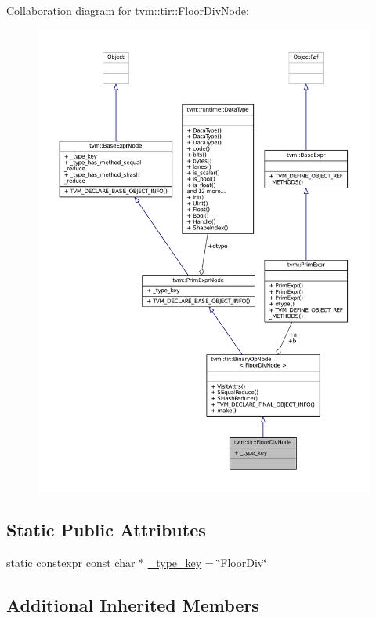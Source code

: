 Collaboration diagram for tvm\+:\+:tir\+:\+:Floor\+Div\+Node\+:
\nopagebreak
\begin{figure}[H]
\begin{center}
\leavevmode
\includegraphics[width=350pt]{classtvm_1_1tir_1_1FloorDivNode__coll__graph}
\end{center}
\end{figure}
\subsection*{Static Public Attributes}
\begin{DoxyCompactItemize}
\item 
static constexpr const char $\ast$ \hyperlink{classtvm_1_1tir_1_1FloorDivNode_a6628963b9442d219dcbb5329682cfe7b}{\+\_\+type\+\_\+key} = \char`\"{}Floor\+Div\char`\"{}
\end{DoxyCompactItemize}
\subsection*{Additional Inherited Members}


